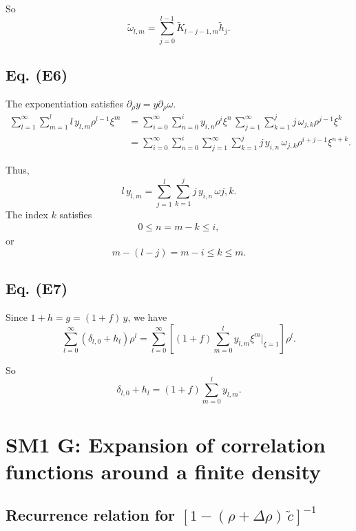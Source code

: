 \documentclass[preprint]{revtex4-1}
\numberwithin{equation}{subsection}
\numberwithin{table}{section}
\begin{document}
So
\[
  \tilde \omega_{l,m}
=
  \sum_{j = 0}^{l-1}
  \tilde K_{l - j - 1, m}
  \tilde h_{j}.
\]



\subsection{Eq. (E6)}

The exponentiation satisfies $\partial_\rho y = y \partial_\rho \omega$.
\begin{align*}
\sum_{l = 1}^\infty
\sum_{m = 1}^l
l \, y_{l, m} \rho^{l-1} \xi^m
&=
\sum_{i = 0}^\infty
\sum_{n = 0}^i
y_{i, n} \rho^{i} \xi^n
\,
\sum_{j = 1}^\infty
\sum_{k = 1}^j
j \, \omega_{j, k} \rho^{j-1} \xi^k
\\
&=
\sum_{i = 0}^\infty
\sum_{n = 0}^i
\sum_{j = 1}^\infty
\sum_{k = 1}^j
j \, y_{i, n} \,
\omega_{j, k} \rho^{i+j-1} \xi^{n+k}.
\end{align*}

Thus,
\[
  l \, y_{l,m}
=
\sum_{j = 1}^{l} \sum_{k = 1}^j
j \, y_{i, n} \, \omega{j, k}.
\]
The index $k$ satisfies
\begin{align*}
   0 \le n = m - k \le i,
\end{align*}
or
\[
  m - (l - j) = m - i \le k \le m.
\]


\subsection{Eq. (E7)}

Since $1+h = g = (1+f) \,y$, we have
\[
  \sum_{l = 0}^\infty (\delta_{l,0} + h_{l}) \rho^l
=
  \sum_{l = 0}^\infty
  \left[
    (1 + f) \sum_{m = 0}^l y_{l, m} \xi^m \Big|_{\xi = 1}
  \right] \rho^l.
\]

So
\[
  \delta_{l, 0} + h_l
  = (1 + f) \sum_{m=0}^l
  y_{l, m}.
\]



\section{SM1 G: Expansion of correlation functions around a finite density}


\subsection{Recurrence relation for $[1 - (\rho + \Delta \rho) \, \tilde c]^{-1}$}
\end{document}
